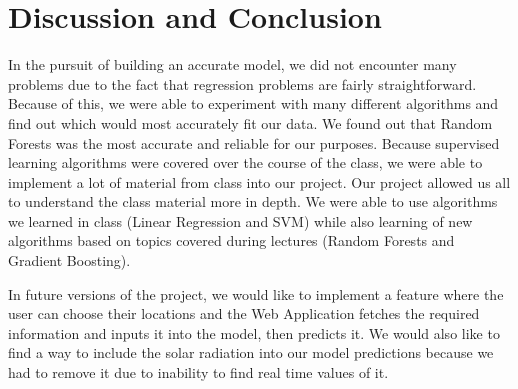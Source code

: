 \documentclass[main.tex]{subfiles}
\begin{document}
\section{Discussion and Conclusion}

In the pursuit of building an accurate model, we did not encounter many problems due to
the fact that regression problems are fairly straightforward. Because of this, we were able to
experiment with many different algorithms and find out which would most accurately fit our
data. We found out that Random Forests was the most accurate and reliable for our purposes.
Because supervised learning algorithms were covered over the course of the class, we
were able to implement a lot of material from class into our project. Our project allowed us all to
understand the class material more in depth. We were able to use algorithms we learned in class
(Linear Regression and SVM) while also learning of new algorithms based on topics covered
during lectures (Random Forests and Gradient Boosting).

In future versions of the project, we would like to implement a feature where the user can
choose their locations and the Web Application fetches the required information and inputs it
into the model, then predicts it. We would also like to find a way to include the solar radiation
into our model predictions because we had to remove it due to inability to find real time values
of it.
\end{document}
